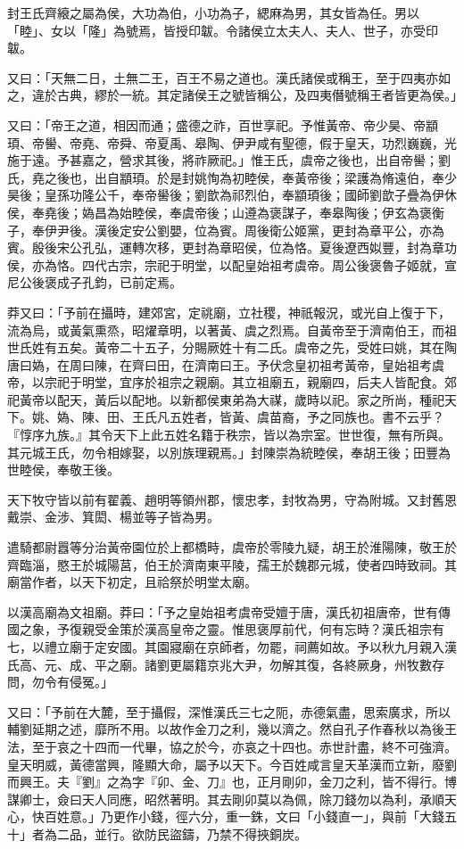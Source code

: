 \begin{pinyinscope}
封王氏齊縗之屬為侯，大功為伯，小功為子，緦麻為男，其女皆為任。男以「睦」、女以「隆」為號焉，皆授印韍。令諸侯立太夫人、夫人、世子，亦受印韍。

又曰：「天無二日，土無二王，百王不易之道也。漢氏諸侯或稱王，至于四夷亦如之，違於古典，繆於一統。其定諸侯王之號皆稱公，及四夷僭號稱王者皆更為侯。」

又曰：「帝王之道，相因而通；盛德之祚，百世享祀。予惟黃帝、帝少昊、帝顓頊、帝嚳、帝堯、帝舜、帝夏禹、皋陶、伊尹咸有聖德，假于皇天，功烈巍巍，光施于遠。予甚嘉之，營求其後，將祚厥祀。」惟王氏，虞帝之後也，出自帝嚳；劉氏，堯之後也，出自顓頊。於是封姚恂為初睦侯，奉黃帝後；梁護為脩遠伯，奉少昊後；皇孫功隆公千，奉帝嚳後；劉歆為祁烈伯，奉顓頊後；國師劉歆子疊為伊休侯，奉堯後；媯昌為始睦侯，奉虞帝後；山遵為褒謀子，奉皋陶後；伊玄為褒衡子，奉伊尹後。漢後定安公劉嬰，位為賓。周後衛公姬黨，更封為章平公，亦為賓。殷後宋公孔弘，運轉次移，更封為章昭侯，位為恪。夏後遼西姒豐，封為章功侯，亦為恪。四代古宗，宗祀于明堂，以配皇始祖考虞帝。周公後褒魯子姬就，宣尼公後褒成子孔鈞，已前定焉。

莽又曰：「予前在攝時，建郊宮，定祧廟，立社稷，神祇報況，或光自上復于下，流為烏，或黃氣熏烝，昭燿章明，以著黃、虞之烈焉。自黃帝至于濟南伯王，而祖世氏姓有五矣。黃帝二十五子，分賜厥姓十有二氏。虞帝之先，受姓曰姚，其在陶唐曰媯，在周曰陳，在齊曰田，在濟南曰王。予伏念皇初祖考黃帝，皇始祖考虞帝，以宗祀于明堂，宜序於祖宗之親廟。其立祖廟五，親廟四，后夫人皆配食。郊祀黃帝以配天，黃后以配地。以新都侯東弟為大禖，歲時以祀。家之所尚，種祀天下。姚、媯、陳、田、王氏凡五姓者，皆黃、虞苗裔，予之同族也。書不云乎？『惇序九族。』其令天下上此五姓名籍于秩宗，皆以為宗室。世世復，無有所與。其元城王氏，勿令相嫁娶，以別族理親焉。」封陳崇為統睦侯，奉胡王後；田豐為世睦侯，奉敬王後。

天下牧守皆以前有翟義、趙明等領州郡，懷忠孝，封牧為男，守為附城。又封舊恩戴崇、金涉、箕閎、楊並等子皆為男。

遣騎都尉囂等分治黃帝園位於上都橋畤，虞帝於零陵九疑，胡王於淮陽陳，敬王於齊臨淄，愍王於城陽莒，伯王於濟南東平陵，孺王於魏郡元城，使者四時致祠。其廟當作者，以天下初定，且祫祭於明堂太廟。

以漢高廟為文祖廟。莽曰：「予之皇始祖考虞帝受嬗于唐，漢氏初祖唐帝，世有傳國之象，予復親受金策於漢高皇帝之靈。惟思褒厚前代，何有忘時？漢氏祖宗有七，以禮立廟于定安國。其園寢廟在京師者，勿罷，祠薦如故。予以秋九月親入漢氏高、元、成、平之廟。諸劉更屬籍京兆大尹，勿解其復，各終厥身，州牧數存問，勿令有侵冤。」

又曰：「予前在大麓，至于攝假，深惟漢氏三七之阨，赤德氣盡，思索廣求，所以輔劉延期之述，靡所不用。以故作金刀之利，幾以濟之。然自孔子作春秋以為後王法，至于哀之十四而一代畢，協之於今，亦哀之十四也。赤世計盡，終不可強濟。皇天明威，黃德當興，隆顯大命，屬予以天下。今百姓咸言皇天革漢而立新，廢劉而興王。夫『劉』之為字『卯、金、刀』也，正月剛卯，金刀之利，皆不得行。博謀卿士，僉曰天人同應，昭然著明。其去剛卯莫以為佩，除刀錢勿以為利，承順天心，快百姓意。」乃更作小錢，徑六分，重一銖，文曰「小錢直一」，與前「大錢五十」者為二品，並行。欲防民盜鑄，乃禁不得挾銅炭。


\end{pinyinscope}
